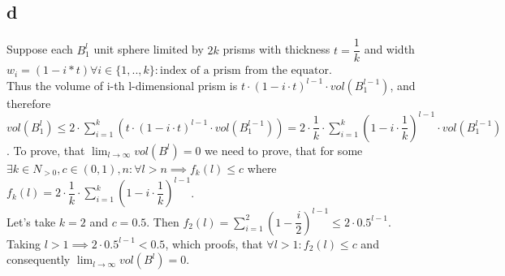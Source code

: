 \subsection*{d}
Suppose each $B^l_1$ unit sphere limited by $2k$ prisms with thickness $t = \dfrac{1}{k}$ and width $w_i = (1 - i*t) \forall i \in \{1, .. , k\}: \text{index of a prism from the equator}$.\\
Thus the volume of i-th l-dimensional prism is $t \cdot (1 - i\cdot t)^{l-1} \cdot vol(B^{l-1}_1)$, and therefore
$vol(B^l_1) \leq 2\cdot \sum_{i=1}^{k}(t \cdot (1 - i\cdot t)^{l-1} \cdot vol(B^{l-1}_1)) = 
	2\cdot \dfrac{1}{k} \cdot \sum_{i = 1}^{k}
	(1 - i\cdot \dfrac{1}{k})^{l-1} \cdot 
	vol(B^{l-1}_1)
$. To prove, that $\lim_{l \to \infty} vol(B^l) = 0$ we need to prove, that for some $\exists k\in N_{>0}, c \in (0,1), n : \forall l > n \implies f_k(l) \leq c$ where $f_k(l) = 2\cdot \dfrac{1}{k} \cdot \sum_{i=1}^{k} (1 - i\cdot \dfrac{1}{k})^{l-1}$.\\ 
Let's take $k = 2$ and $c = 0.5$. Then $f_2(l) = \sum_{i = 1}^{2} (1 - \dfrac{i}{2})^{l-1} \leq 2\cdot 0.5^{l-1}$. Taking $l > 1 \implies 2\cdot 0.5^{l-1} < 0.5$, which proofs, that  $\forall l > 1: f_2(l) \leq c $ and consequently $\lim_{l \to \infty} vol(B^l) = 0$.
 